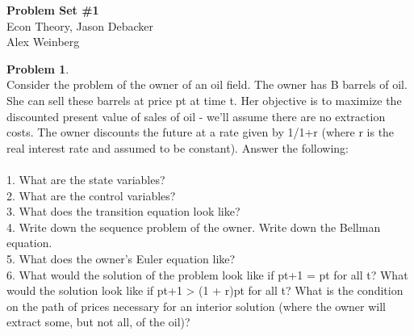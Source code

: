 \documentclass[letterpaper,12pt]{article}
\theoremstyle{definition}
\newtheorem{problem}[theorem]{Problem}
\begin{document}
\begin{flushleft}
  \textbf{\large{Problem Set \#1}} \\
  Econ Theory, Jason Debacker \\
  Alex Weinberg
\end{flushleft}

\vspace{5mm}



\begin{problem} ~\\
Consider the problem of the owner of an oil field. The owner has B barrels of oil. She can
sell these barrels at price pt at time t. Her objective is to maximize the discounted present
value of sales of oil - we’ll assume there are no extraction costs. The owner discounts the
future at a rate given by 1/1+r (where r is the real interest rate and assumed to be constant). Answer the following: \\~\\
1. What are the state variables? \\
2. What are the control variables? \\
3. What does the transition equation look like? \\
4. Write down the sequence problem of the owner. Write down the Bellman equation. \\
5. What does the owner’s Euler equation like? \\
6. What would the solution of the problem look like if pt+1 = pt for all t? What would the solution look like if pt+1 > (1 + r)pt for all t? What is the condition on the path of prices necessary for an interior solution (where the owner will extract some, but not all, of the oil)?
\end{problem}
\end{document}
